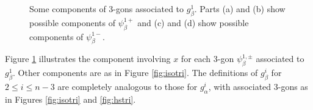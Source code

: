 \documentclass[11pt]{article}
\theoremstyle{plain} \newtheorem{thm}{Theorem}[subsection]
\theoremstyle{plain} \newtheorem{cor}[thm]{Corollary}
\theoremstyle{plain} \newtheorem{prop}[thm]{Proposition}
\theoremstyle{plain} \newtheorem{conj}[thm]{Conjecture}
\theoremstyle{plain} \newtheorem{lem}[thm]{Lemma}
\theoremstyle{definition} \newtheorem{df}[thm]{Definition}
\theoremstyle{remark} \newtheorem{rmk}[thm]{Remark}
\theoremstyle{remark} \newtheorem{obs}[thm]{Observation}
\numberwithin{equation}{section}
\begin{document}
\begin{figure}[h]
\centering
{}\quad
{}
\quad
{}
\caption[Components of 3-gons for $g_{\beta}^1$ in the proof of Lemma \ref{lem:RredR}]{ Some components of 3-gons associated to $g_{\beta}^1$.  Parts (a) and (b) show possible components of $\psi_{\beta}^{1+}$ and (c) and (d) show possible components of $\psi_{\beta}^{1-}$.\label{fig:rb1tri}}
\end{figure}

Figure \ref{fig:rb1tri} illustrates the component involving $x$ for each 3-gon $\psi_{\beta}^{1,\pm}$ associated to $g_{\beta}^1$.  Other components are as in Figure \ref{fig:isotri}.  The definitions of $g_{\beta}^i$ for $2 \leq i \leq n-3$ are completely analogous to those for $g_{\alpha}^i$, with associated 3-gons as in Figures \ref{fig:isotri} and \ref{fig:hstri}.
\end{document}
